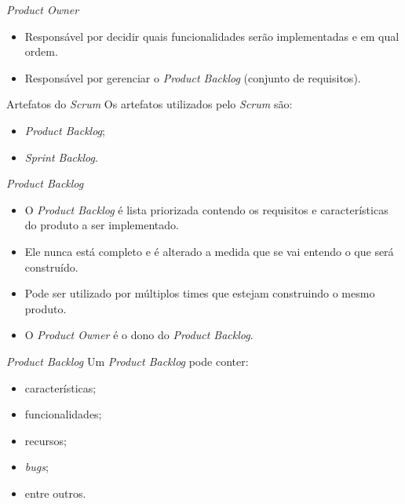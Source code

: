 \documentclass[11pt]{beamer}
\begin{document}
    \begin{frame}{\textit{Product Owner}}
      \begin{itemize}
         \item Responsável por decidir quais funcionalidades serão implementadas e em qual ordem.
         \item Responsável por gerenciar o \textit{Product Backlog} (conjunto de requisitos).
      \end{itemize}
    \end{frame}

    \begin{frame}{Artefatos do \textit{Scrum}}
      Os artefatos utilizados pelo \textit{Scrum} são:
      \begin{itemize}
         \item \textit{Product Backlog};
         \item \textit{Sprint Backlog}.
      \end{itemize}
    \end{frame}

    \begin{frame}{\textit{Product Backlog}}
      \begin{itemize}
         \item O \textit{Product Backlog} é lista priorizada contendo os requisitos e características do produto a ser implementado.
         \item Ele nunca está completo e é alterado a medida que se vai entendo o que será construído.
         \item Pode ser utilizado por múltiplos times que estejam construindo o mesmo produto.
         \item O \textit{Product Owner} é o dono do \textit{Product Backlog}.
      \end{itemize}
    \end{frame}

    \begin{frame}{\textit{Product Backlog}}
      Um \textit{Product Backlog} pode conter:
      \begin{itemize}
         \item características;
         \item funcionalidades;
         \item recursos;
         \item \textit{bugs};
         \item entre outros.
      \end{itemize}
    \end{frame}
\end{document}
